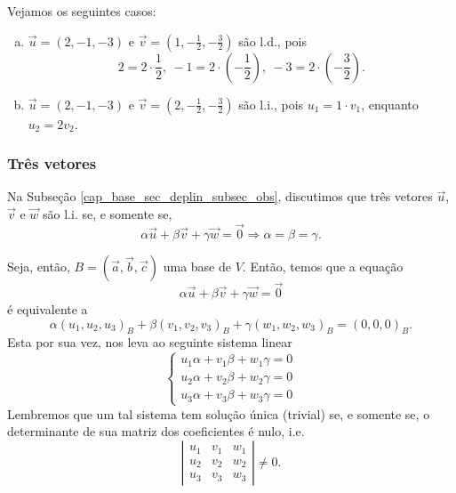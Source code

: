 \begin{ex}
  Vejamos os seguintes casos:
  \begin{enumerate}[a)]
  \item $\vec{u} = (2,-1,-3)$ e $\vec{v} = \left(1,-\frac{1}{2},-\frac{3}{2}\right)$ são l.d., pois
    \begin{equation}
      2 = 2\cdot \frac{1}{2},~-1 = 2\cdot\left(-\frac{1}{2}\right),~-3 = 2\cdot\left(-\frac{3}{2}\right).
    \end{equation}
  \item $\vec{u} = (2,-1,-3)$ e $\vec{v} = \left(2,-\frac{1}{2},-\frac{3}{2}\right)$ são l.i., pois $u_1 = 1\cdot v_1$, enquanto $u_2 = 2v_2$.
  \end{enumerate}
\end{ex}

\subsubsection{Três vetores}

Na Subseção \ref{cap_base_sec_deplin_subsec_obs}, discutimos que três vetores $\vec{u}$, $\vec{v}$ e $\vec{w}$ são l.i. se, e somente se,
\begin{equation}
  \alpha\vec{u}+\beta\vec{v}+\gamma\vec{w}=\vec{0} \Rightarrow \alpha=\beta=\gamma.
\end{equation}

Seja, então, $B = (\vec{a}, \vec{b}, \vec{c})$ uma base de $V$. Então, temos que a equação
\begin{equation}
  \alpha\vec{u}+\beta\vec{v}+\gamma\vec{w} = \vec{0}
\end{equation}
é equivalente a
\begin{equation}
  \alpha(u_1,u_2,u_3)_B+\beta(v_1,v_2,v_3)_B+\gamma(w_1,w_2,w_3)_B=(0, 0, 0)_B.
\end{equation}
Esta por sua vez, nos leva ao seguinte sistema linear
\begin{equation}
  \left\{
    \begin{array}{l}
      u_1\alpha + v_1\beta + w_1\gamma = 0\\
      u_2\alpha + v_2\beta + w_2\gamma = 0\\
      u_3\alpha + v_3\beta + w_3\gamma = 0
    \end{array}
  \right.
\end{equation}
Lembremos que um tal sistema tem solução única (trivial) se, e somente se, o determinante de sua matriz dos coeficientes é nulo, i.e.
\begin{equation}
  \left|\begin{array}{ccc}
    u_1 & v_1 & w_1\\
    u_2 & v_2 & w_2\\
    u_3 & v_3 & w_3
  \end{array}\right| \neq 0.
\end{equation}


